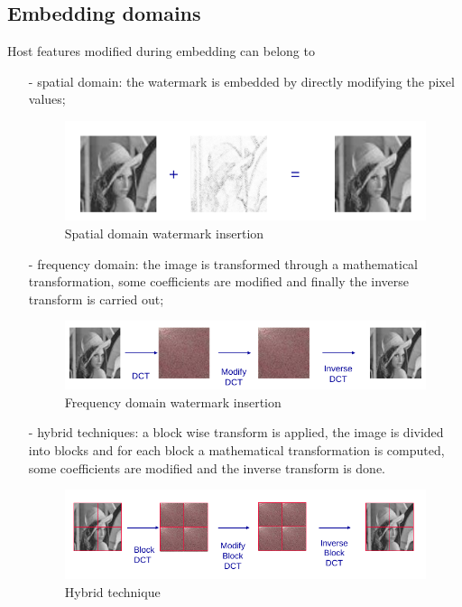 \subsection{Embedding domains}
Host features modified during embedding can
belong to 
\begin{itemize}
\item[-] spatial domain: the watermark is embedded by directly modifying the pixel values;
\begin{figure}[h!]
\centering
\includegraphics[width=1\textwidth]{./img/domain1.png}
\caption{\small{Spatial domain watermark insertion}}
\label{fig:dom1}
\end{figure}
\item[-] frequency domain: the image is transformed through a mathematical transformation, some coefficients are modified and finally the inverse transform is carried out;
\begin{figure}[h!]
\centering
\includegraphics[width=1\textwidth]{./img/domain2.png}
\caption{\small{Frequency domain watermark insertion}}
\label{fig:dom2}
\end{figure}
\item[-] hybrid techniques: a block wise transform is applied, the image is divided
into blocks and for each block a mathematical transformation is computed, some coefficients are modified and the inverse transform is done.
\begin{figure}[h!]
\centering
\includegraphics[width=1\textwidth]{./img/domain3.png}
\caption{\small{Hybrid technique}}
\label{fig:dom3}
\end{figure}
\end{itemize}

